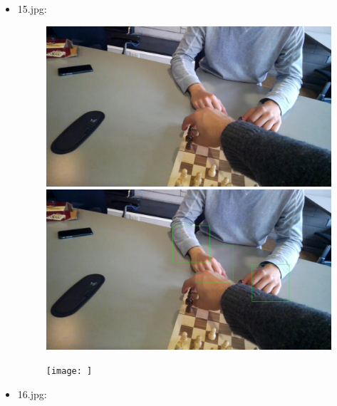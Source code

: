 \begin{itemize}
\begin{figure}[!htb]
\begin{minipage}{0.33\textwidth}
            \end{minipage}
        \end{figure}
    \item 15.jpg:
        \begin{figure}[!htb]
            \begin{minipage}{0.33\textwidth}
            \centering
            \includegraphics[scale = 0.135]{images/results/original/15.jpg}
            \end{minipage}\hfill
            \begin{minipage}{0.33\textwidth}
                \centering
                \includegraphics[scale = 0.135]{images/results/detection/15_detections.jpg}
            \end{minipage}\hfill
            \begin{minipage}{0.33\textwidth}
                \centering
                \texttt{[image: ]}
            \end{minipage}
        \end{figure}
    \item 16.jpg:
        \begin{figure}[!htb]

\end{figure}
\end{itemize}
